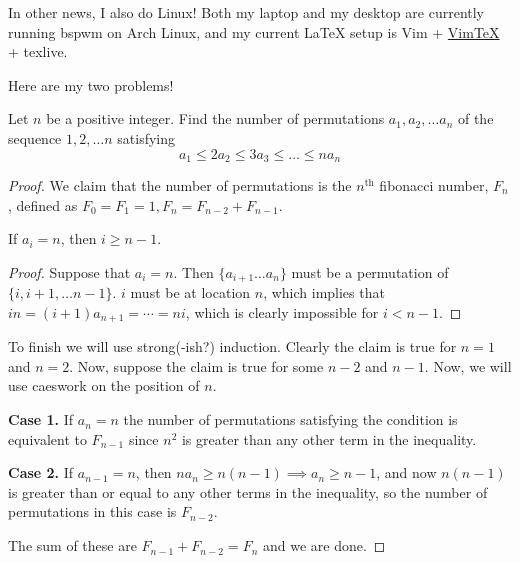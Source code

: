 \documentclass[a4paper]{scrartcl}
\begin{document}
In other news, I also do Linux! Both my laptop and my desktop are currently running bspwm on Arch Linux, and my current \LaTeX{} setup is Vim + \href{https://github.com/lervag/vimtex}{VimTeX} + texlive. 

\newpage
Here are my two problems!

\begin{example*}
	Let $n$ be a positive integer. Find the number of permutations $a_1, a_2, \dots a_n$ of the sequence $1,2,\dots n$ satisfying 
	\[a_1 \leqslant 2a_2 \leqslant 3a_3 \leqslant \dots \leqslant na_n\]
\end{example*}
\begin{proof}
	We claim that the number of permutations is the $n^\text{th}$ fibonacci number, $F_n$, defined as $F_0 = F_1 = 1, F_n = F_{n-2} + F_{n-1}$.
	\begin{claim*}
		If $a_i = n$, then $i \geq n-1$.
	\end{claim*}
	\begin{proof}
	Suppose that $a_i = n$. Then $\{a_{i+1} \dots a_n\}$ must be a permutation of $\{ i, i+1, \dots n-1\}$. $i$ must be at location $n$, which implies that $in = (i+1)a_{n+1} = \cdots = ni$, which is clearly impossible for $i < n-1$.
	\end{proof}

	To finish we will use strong(-ish?) induction. Clearly the claim is true for $n=1$ and $n=2$. Now, suppose the claim is true for some $n-2$ and $n-1$. Now, we will use caeswork on the position of $n$.

	\textbf{Case 1.} If $a_n = n$ the number of permutations satisfying the condition is equivalent to $F_{n-1}$ since $n^2$ is greater than any other term in the inequality.

	\textbf{Case 2.} If $a_{n-1} = n$, then $na_n \geq n(n-1) \implies a_{n} \geq n-1$, and now $n(n-1)$ is greater than or equal to any other terms in the inequality, so the number of permutations in this case is $F_{n-2}$.

	The sum of these are $F_{n-1} + F_{n-2} = F_n$ and we are done.
	
\end{proof}
\end{document}
